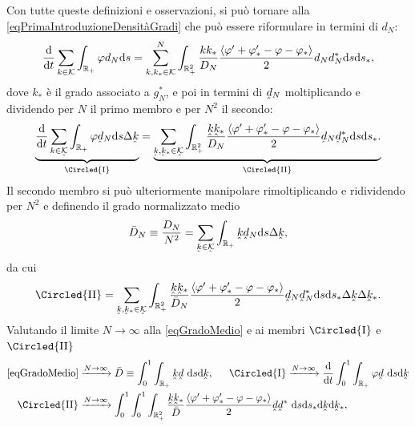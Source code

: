       Con tutte queste definizioni e osservazioni, si può tornare alla \cref{eqPrimaIntroduzioneDensitàGradi} che può essere riformulare in termini di \(d_N\):
      \begin{equation*}
        \frac{\mathrm{d}}{\mathrm{d}t}\sum_{k\in\mathcal K}\int_{\mathbb R_+}\varphi d_N\mathrm{d} s=
        \sum_{k,k_*\in\mathcal K}^N\int_{\mathbb R_+^2}\frac{kk_*}{D_N}
        \frac{\langle\varphi'+\varphi'_*-\varphi-\varphi_*\rangle}2
        d_Nd^*_N\mathrm{d} s\mathrm{d} s_*,
      \end{equation*}
      dove \(k_*\) è il grado associato a \(g_N^*\), e poi in termini di \(\underhat d_N\) moltiplicando e dividendo per \(N\) il primo membro e per \(N^2\) il secondo:
      \begin{equation*}
        \underbrace{
          \derS{}t\sum_{k\in\underhat{\mathcal K}}\int_{\RPlus}\varphi\underhat d_N\de s\Delta\underhat k
          \vphantom{\frac{\langle\varphi'+\varphi'_*-\varphi-\varphi_*\rangle}{2D_N}}
        }_{\Circled{\mathrm{I}}} =
        \underbrace{
          \sum_{\underhat k,\underhat k_*\in\underhat{\mathcal K}}\int_{\RPlus^2}
          \frac{\underhat k\underhat k_*}{D_N}
          \frac{\langle\varphi'+\varphi'_*-\varphi-\varphi_*\rangle}2
          \underhat d_N\underhat d^*_N\de s\de s_*.
        }_{\Circled{\mathrm{II}}}
      \end{equation*}
      Il secondo membro si può ulteriormente manipolare rimoltiplicando e ridividendo per \(N^2\) e definendo il grado normalizzato medio
      \begin{equation}
        \label{eqGradoMedio}
        \bar D_N\equiv\frac{D_N}{N^2}=
        \sum_{\underhat k\in\underhat{\mathcal K}}
        \int_{\RPlus}\underhat k\underhat d_N\de s\Delta\underhat k,
      \end{equation}
      da cui
      \begin{equation*}
        \Circled{\mathrm{II}}=
        \sum_{\underhat k,\underhat k_*\in\underhat{\mathcal K}}\int_{\RPlus^2}\frac{\underhat k\underhat k_*}{\bar D_N}
        \frac{\langle\varphi'+\varphi'_*-\varphi-\varphi_*\rangle}2
        \underhat d_N\underhat d^*_N\de s\de s_*\Delta\underhat k\Delta\underhat k_*.
      \end{equation*}
      Valutando il limite \(N\to\infty\) alla \cref{eqGradoMedio} e ai membri \(\Circled{\mathrm I}\) e \(\Circled{\mathrm{II}}\)
      \begin{equation*}
        \begin{aligned}
          \cref{eqGradoMedio}&\xrightarrow{N\to\infty}
          \bar D\equiv\int_0^1\int_{\RPlus}\underhat k\underhat d\ \de s\de\underhat k,
          \hspace{1.5em}\Circled{\mathrm I}\xrightarrow{N\to\infty}
          \derS{}t\int_0^1\int_{\RPlus}\varphi\underhat d\ \de s\de\underhat k\\
          \Circled{\mathrm{II}}&\xrightarrow{N\to\infty}
          \int_0^1\int_0^1\int_{\RPlus^2}\frac{\underhat k\underhat k_*}{\bar D}
          \frac{\langle\varphi'+\varphi'_*-\varphi-\varphi_*\rangle}2
          \underhat d\underhat d^*\ \de s\de s_*\de\underhat k\de\underhat k_*,
        \end{aligned}
      \end{equation*}
